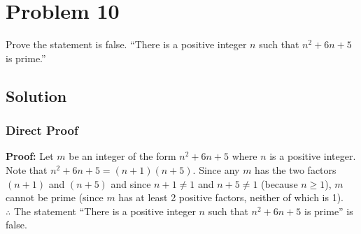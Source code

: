 \documentclass[table]{article}
\begin{document}
\section{Problem 10}
Prove the statement is false. ``There is a positive integer $n$ such that $n^2 + 6n + 5$ is prime.''
\subsection{Solution}
\subsubsection{Direct Proof}
\textbf{Proof:} Let $m$ be an integer of the form $n^2 + 6n + 5$ where $n$ is a positive integer.\\
Note that $n^2 + 6n + 5 = (n+1)(n+5)$. Since any $m$ has the two factors $(n+1)$ and $(n+5)$ and since $n + 1 \neq 1$ and $n + 5 \neq 1$ (because $n \geq 1$), $m$ cannot be prime (since $m$ has at least 2 positive factors, neither of which is 1).\\
$\therefore$ The statement ``There is a positive integer $n$ such that $n^2 + 6n + 5$ is prime'' is false.
\end{document}
